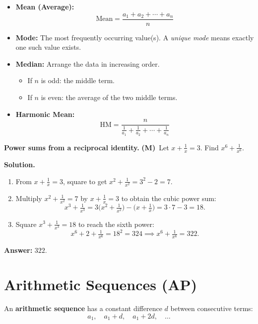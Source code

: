 \documentclass[12pt]{extarticle}
\newcommand{\difficulty}[1]{\textbf{(#1)}\,}
\begin{document}
\begin{itemize}
\item \textbf{Mean (Average):}
\[
\text{Mean} = \frac{a_1 + a_2 + \cdots + a_n}{n}
\]

\item \textbf{Mode:} The most frequently occurring value(s). A \emph{unique mode} means exactly one such value exists.

\item \textbf{Median:} Arrange the data in increasing order.
\begin{itemize}
\item If $n$ is odd: the middle term.
\item If $n$ is even: the average of the two middle terms.
\end{itemize}

\item \textbf{Harmonic Mean:}
\[
\text{HM} = \frac{n}{\frac{1}{a_1} + \frac{1}{a_2} + \cdots + \frac{1}{a_n}}
\]
\end{itemize}

\begin{examplebox}
\textbf{Power sums from a reciprocal identity.} \difficulty{M} Let $x + \tfrac{1}{x} = 3$. Find $x^6 + \tfrac{1}{x^6}$.

	\textbf{Solution.}
\begin{enumerate}[leftmargin=1.2em]
    \item From $x + \tfrac{1}{x} = 3$, square to get $x^2 + \tfrac{1}{x^2} = 3^2 - 2 = 7$.
    \item Multiply $x^2 + \tfrac{1}{x^2} = 7$ by $x + \tfrac{1}{x} = 3$ to obtain the cubic power sum:
    \[
    x^3 + \tfrac{1}{x^3} = 3\bigl(x^2 + \tfrac{1}{x^2}\bigr) - \bigl(x + \tfrac{1}{x}\bigr) = 3\cdot 7 - 3 = 18.
    \]
    \item Square $x^3 + \tfrac{1}{x^3} = 18$ to reach the sixth power:
    \[
    x^6 + 2 + \tfrac{1}{x^6} = 18^2 = 324 \implies x^6 + \tfrac{1}{x^6} = 322.
    \]
\end{enumerate}

	\textbf{Answer:} $\boxed{322}$.
\end{examplebox}

\section{Arithmetic Sequences (AP)}

An \textbf{arithmetic sequence} has a constant difference $d$ between consecutive terms:
\[
a_1, \quad a_1+d, \quad a_1+2d, \quad \dots
\]
\end{document}
